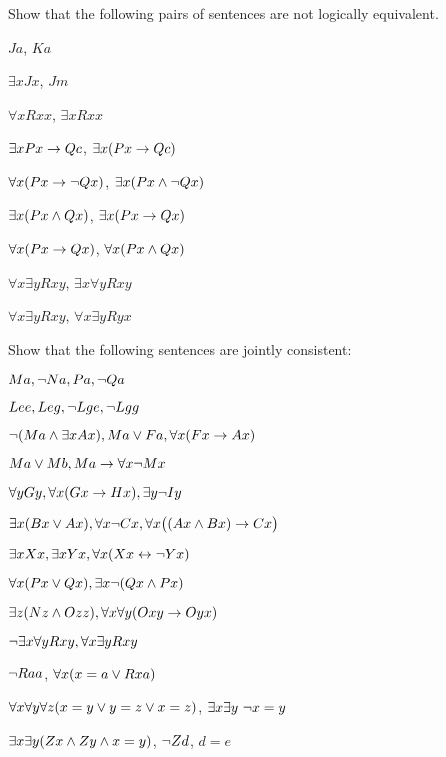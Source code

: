 \begin{earg}
\problempart
\label{pr.NotEquiv}
Show that the following pairs of sentences are not logically equivalent.
\begin{earg}
\item $Ja$, $Ka$
\item $\exists x Jx$, $Jm$
\item $\forall x Rxx$, $\exists x Rxx$
\item $\exists x Px \rightarrow Qc$, $\exists x (Px \rightarrow Qc)$
\item $\forall x(Px \rightarrow \neg Qx)$, $\exists x(Px \wedge \neg Qx)$
\item $\exists x(Px \wedge Qx)$, $\exists x(Px \rightarrow Qx)$
\item $\forall x(Px\rightarrow Qx)$, $\forall x(Px \wedge Qx)$
\item $\forall x\exists y Rxy$, $\exists x\forall y Rxy$
\item $\forall x\exists y Rxy$, $\forall x\exists y Ryx$
\end{earg}



\problempart
Show that the following sentences are jointly consistent:
\begin{earg}
\item $Ma, \neg Na, Pa, \neg Qa$
\item $Lee, Leg, \neg Lge, \neg Lgg$
\item $\neg (Ma \wedge \exists x Ax), Ma \vee Fa, \forall x(Fx \rightarrow Ax)$
\item $Ma \vee Mb, Ma \rightarrow \forall x \neg Mx$
\item $\forall y Gy, \forall x (Gx \rightarrow Hx), \exists y \neg Iy$
\item $\exists x(Bx \vee Ax), \forall x \neg Cx, \forall x\bigl( (Ax \wedge Bx) \rightarrow Cx\bigr)$
\item $\exists x Xx, \exists x Yx, \forall x(Xx \leftrightarrow \neg Yx)$
\item $\forall x(Px \vee Qx), \exists x\neg(Qx \wedge Px)$
\item $\exists z(Nz \wedge Ozz), \forall x\forall y(Oxy \rightarrow Oyx)$
\item $\neg \exists x \forall y Rxy, \forall x \exists y Rxy$
\item $\neg Raa$, $\forall x (x=a \vee Rxa)$
\item $\forall x\forall y\forall z(x=y \vee y=z \vee x=z)$, $\exists x\exists y\ \neg x= y$
\item $\exists x\exists y(Zx \wedge Zy \wedge x=y)$, $\neg Zd$, $d=e$
\end{earg}


\end{earg}
